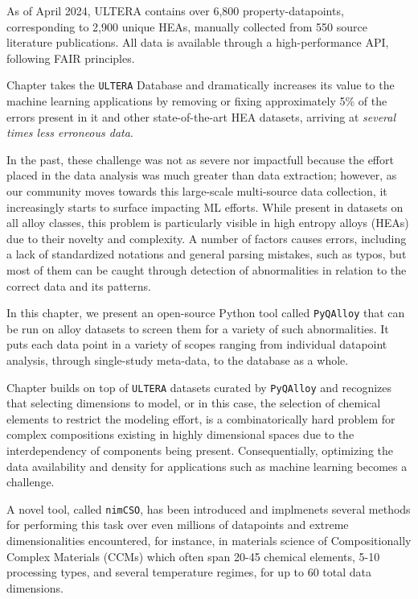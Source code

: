 As of April 2024, ULTERA contains over 6,800 property-datapoints, corresponding to 2,900 unique HEAs, manually collected from 550 source literature publications. All data is available through a high-performance API, following FAIR principles.


Chapter  takes the \texttt{ULTERA} Database and dramatically increases its value to the machine learning applications by removing or fixing approximately 5\% of the errors present in it and other state-of-the-art HEA datasets, arriving at \emph{several times less erroneous data}.

In the past, these challenge was not as severe nor impactfull because the effort placed in the data analysis was much greater than data extraction; however, as our community moves towards this large-scale multi-source data collection, it increasingly starts to surface impacting ML efforts. While present in datasets on all alloy classes, this problem is particularly visible in high entropy alloys (HEAs) due to their novelty and complexity. A number of factors causes errors, including a lack of standardized notations and general parsing mistakes, such as typos, but most of them can be caught through detection of abnormalities in relation to the correct data and its patterns.

In this chapter, we present an open-source Python tool called \texttt{PyQAlloy} that can be run on alloy datasets to screen them for a variety of such abnormalities. It puts each data point in a variety of scopes ranging from individual datapoint analysis, through single-study meta-data, to the database as a whole.


Chapter  builds on top of \texttt{ULTERA} datasets curated by \texttt{PyQAlloy} and recognizes that selecting dimensions to model, or in this case, the selection of chemical elements to restrict the modeling effort, is a combinatorically hard problem for complex compositions existing in highly dimensional spaces due to the interdependency of components being present. Consequentially, optimizing the data availability and density for applications such as machine learning becomes a challenge.

A novel tool, called \texttt{nimCSO}, has been introduced and implmenets several methods for performing this task over even millions of datapoints and extreme dimensionalities encountered, for instance, in materials science of Compositionally Complex Materials (CCMs) which often span 20-45 chemical elements, 5-10 processing types, and several temperature regimes, for up to 60 total data dimensions.

